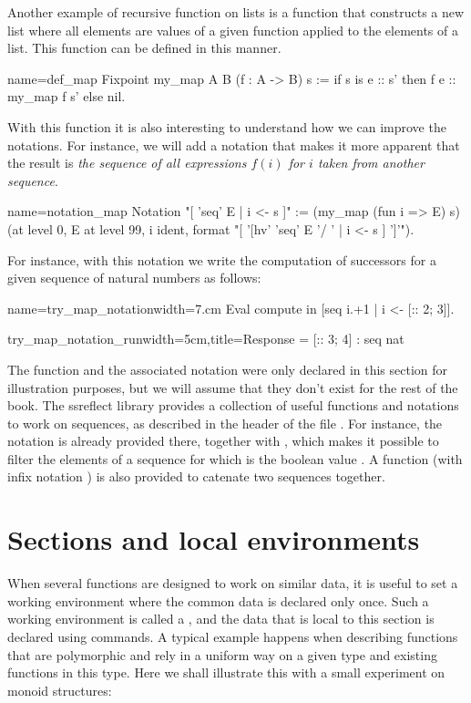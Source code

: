 Another example of recursive function on lists is a function that constructs
a new list where all elements are values of a given function applied to
the elements of a list.  This function can be defined in this
manner.

\begin{coq}{name=def_map}{}
Fixpoint my_map A B (f : A -> B) s :=
  if s is e :: s' then f e :: my_map f s' else nil.
\end{coq}
With this function it is also interesting to understand how we can
improve the notations.  For instance, we will add a notation that
makes it more apparent that the result is {\em the sequence of all
expressions \(f(i)\) for \(i\) taken from another sequence}.

\begin{coq}{name=notation_map}{}
Notation "[ 'seq' E | i <- s ]" := (my_map (fun i => E) s)
  (at level 0, E at level 99, i ident,
   format "[ '[hv' 'seq' E '/ ' | i <- s  ] ']'").
\end{coq}
For instance, with this notation we write the computation of successors
for a given sequence of natural numbers as follows:

\begin{coq}{name=try_map_notation}{width=7.cm}
Eval compute in [seq i.+1 | i <- [:: 2; 3]].
\end{coq}
\begin{coqout}{try_map_notation_run}{width=5cm,title=Response}
= [:: 3; 4] : seq nat
\end{coqout}
The function  and the associated notation were only declared
in this section for illustration purposes, but we will assume that
they don't exist for the rest of the book.  The ssreflect library
provides a collection of useful functions and notations to work on
sequences, as described in the header of the file .  For
instance, the notation \C{[seq F | i <- s]} is already provided there,
together with \C{[seq i | i < s | p]}, which makes it possible to
filter the elements of a sequence for which  is the boolean
value .  A function  (with infix notation \C{++}) is
also provided to catenate two sequences together.

\section{Sections and local environments}
When several functions are designed to work on similar data, it is
useful to set a working environment where the common data is declared
only once.  Such a working environment is called a , and
the data that is local to this section is declared using 
commands.  A typical example happens when describing functions that
are polymorphic and rely in a uniform way on a given type and existing
functions in this type.  Here we shall illustrate this with a small
experiment on monoid structures:

